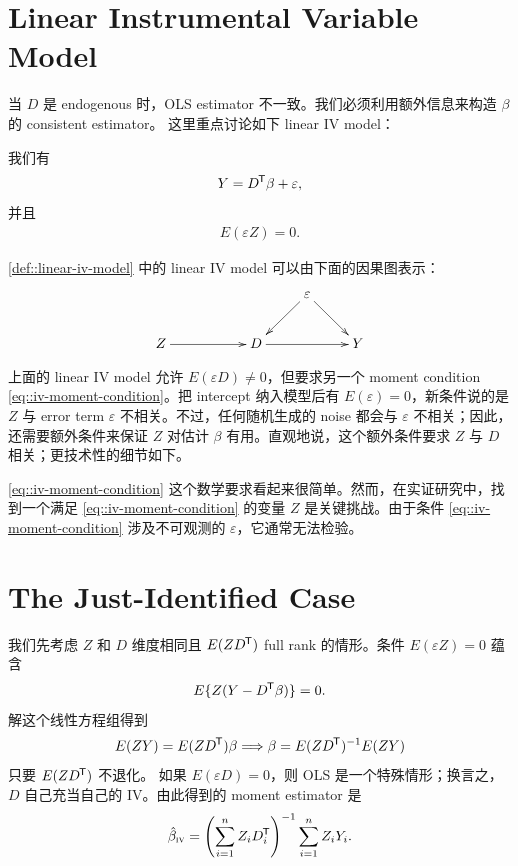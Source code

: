 \section{Linear Instrumental Variable Model}
\label{sec::linear-iv-model}



当 $D$ 是 endogenous 时，OLS estimator 不一致。我们必须利用额外信息来构造 $\beta$ 的 consistent estimator。
这里重点讨论如下 linear IV model：


\begin{definition}
\label{def::linear-iv-model}
我们有
$$
Y = D  ^{\mkern-1.5mu\mathsf{T}} \beta  + \varepsilon ,
$$
并且
\begin{eqnarray}\label{eq::iv-moment-condition}
E(\varepsilon Z) = 0 . 
\end{eqnarray}
\end{definition}


\cref{def::linear-iv-model} 中的 linear IV model 可以由下面的因果图表示：
$$
\xymatrix{
&&&\varepsilon  \ar[dl] \ar[dr] &\\
Z\ar[rr]&&D \ar[rr]&&Y
}
$$

上面的 linear IV model 允许 $E(\varepsilon D) \neq 0$，但要求另一个 moment condition \cref{eq::iv-moment-condition}。把 intercept 纳入模型后有 $E(\varepsilon) = 0$，新条件说的是 $Z$ 与 error term $\varepsilon$ 不相关。不过，任何随机生成的 noise 都会与 $\varepsilon$ 不相关；因此，还需要额外条件来保证 $Z$ 对估计 $\beta$ 有用。直观地说，这个额外条件要求 $Z$ 与 $D$ 相关；更技术性的细节如下。  
 

\cref{eq::iv-moment-condition} 这个数学要求看起来很简单。然而，在实证研究中，找到一个满足 \cref{eq::iv-moment-condition} 的变量 $Z$ 是关键挑战。由于条件 \cref{eq::iv-moment-condition} 涉及不可观测的 $\varepsilon$，它通常无法检验。 
 


\section{The Just-Identified Case}
\label{sec::iv-just-identify}

我们先考虑 $Z$ 和 $D$ 维度相同且 $E(ZD^{\mkern-1.5mu\mathsf{T}})$ full rank 的情形。条件 $E(\varepsilon Z) = 0$ 蕴含
$$
E\{  Z (Y -  D ^{\mkern-1.5mu\mathsf{T}} \beta) \} = 0 .
$$
解这个线性方程组得到
$$
E(  ZY)  = E(ZD^{\mkern-1.5mu\mathsf{T}}) \beta  \\
 \Longrightarrow 
\beta = E(ZD^{\mkern-1.5mu\mathsf{T}}) ^{-1} E(  ZY)  
$$
只要 $E(ZD^{\mkern-1.5mu\mathsf{T}})$ 不退化。
如果 $E(\varepsilon D) = 0$，则 OLS 是一个特殊情形；换言之，$D$ 自己充当自己的 IV。由此得到的 moment estimator 是
\begin{eqnarray}\label{eq::iv-estimator}
\hat{\beta}_\textsc{iv} = \left(  \sum_{i=1}^n Z_i D_i^{\mkern-1.5mu\mathsf{T}} \right)^{-1}  \sum_{i=1}^n Z_iY_i.
\end{eqnarray}

